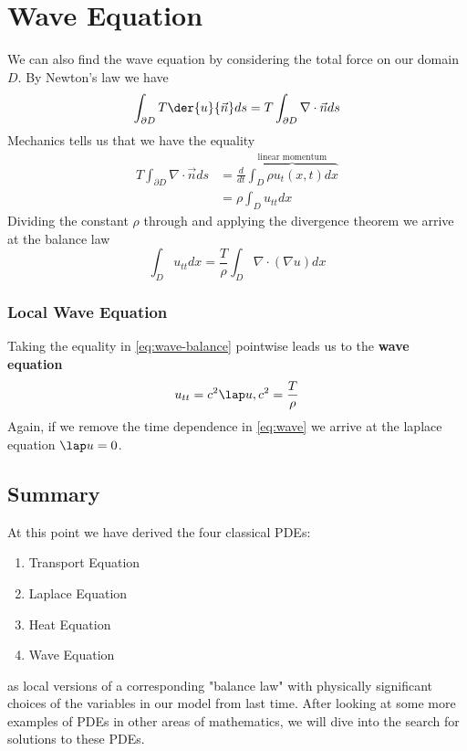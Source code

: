\documentclass{bkcnotes}
\begin{document}
\section{Wave Equation}
We can also find the wave equation by considering the total force on
our domain $D$. By Newton's law we have
\begin{equation}
  \label{eq:newton}
  \int_{\partial D} T \der{u}{\vec{n}}ds = T \int_{\partial D} \nabla \cdot \vec{n}ds
\end{equation}
Mechanics tells us that we have the equality
\begin{align*}
  T \int_{\partial D} \nabla \cdot \vec{n}ds &=
  \frac{d}{dt}\overbrace{\int_{D}\rho u_t(x,t)dx}^{\text{linear
      momentum}} \\
  &= \rho\int_D u_{tt}dx
\end{align*}
Dividing the constant $\rho$ through and applying the divergence
theorem we arrive at the balance law
\begin{equation}
  \label{eq:wave-balance}
  \int_{D} u_{tt}dx = \frac{T}{\rho}\int_{D} \nabla \cdot (\nabla u)dx
\end{equation}

\subsubsection{Local Wave Equation}
Taking the equality in \eqref{eq:wave-balance} pointwise leads us to the
\textbf{wave equation}
\begin{equation}
  \label{eq:wave}
  u_{tt} = c^2\lap u, c^2 = \frac{T}{\rho}
\end{equation}
Again, if we remove the time dependence in \eqref{eq:wave} we arrive at the
laplace equation $\lap u = 0$.

\subsection{Summary}
At this point we have derived the four classical PDEs:
\begin{enumerate}
\item Transport Equation
\item Laplace Equation
\item Heat Equation
\item Wave Equation
\end{enumerate}
as local versions of a corresponding "balance law" with physically
significant choices of the variables in our model from last
time. After looking at some more examples of PDEs in other areas of
mathematics, we will dive into the search for solutions to these PDEs.
\end{document}
